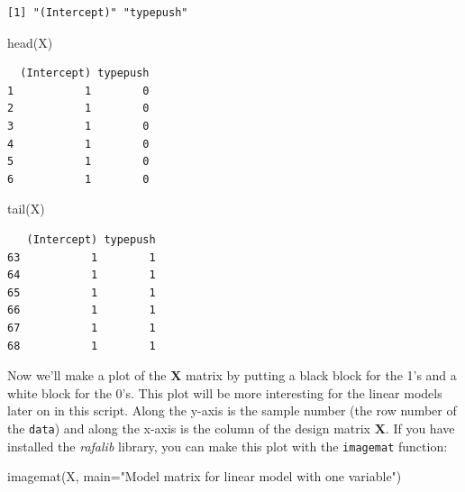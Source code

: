 \documentclass[
  letterpaper,
  DIV=11,
  numbers=noendperiod]{scrartcl}
\newenvironment{Shaded}{\begin{snugshade}}{\end{snugshade}}
\newcommand{\AttributeTok}[1]{\textcolor[rgb]{0.40,0.45,0.13}{#1}}
\newcommand{\FunctionTok}[1]{\textcolor[rgb]{0.28,0.35,0.67}{#1}}
\newcommand{\NormalTok}[1]{\textcolor[rgb]{0.00,0.23,0.31}{#1}}
\newcommand{\StringTok}[1]{\textcolor[rgb]{0.13,0.47,0.30}{#1}}
\begin{document}
\begin{verbatim}
[1] "(Intercept)" "typepush"   
\end{verbatim}

\begin{Shaded}
\begin{Highlighting}[]
\FunctionTok{head}\NormalTok{(X)}
\end{Highlighting}
\end{Shaded}

\begin{verbatim}
  (Intercept) typepush
1           1        0
2           1        0
3           1        0
4           1        0
5           1        0
6           1        0
\end{verbatim}

\begin{Shaded}
\begin{Highlighting}[]
\FunctionTok{tail}\NormalTok{(X)}
\end{Highlighting}
\end{Shaded}

\begin{verbatim}
   (Intercept) typepush
63           1        1
64           1        1
65           1        1
66           1        1
67           1        1
68           1        1
\end{verbatim}

Now we'll make a plot of the \(\mathbf{X}\) matrix by putting a black
block for the 1's and a white block for the 0's. This plot will be more
interesting for the linear models later on in this script. Along the
y-axis is the sample number (the row number of the \texttt{data}) and
along the x-axis is the column of the design matrix \(\mathbf{X}\). If
you have installed the \emph{rafalib} library, you can make this plot
with the \texttt{imagemat} function:

\begin{Shaded}
\begin{Highlighting}[]
\FunctionTok{imagemat}\NormalTok{(X, }\AttributeTok{main=}\StringTok{"Model matrix for linear model with one variable"}\NormalTok{)}
\end{Highlighting}
\end{Shaded}
\end{document}
